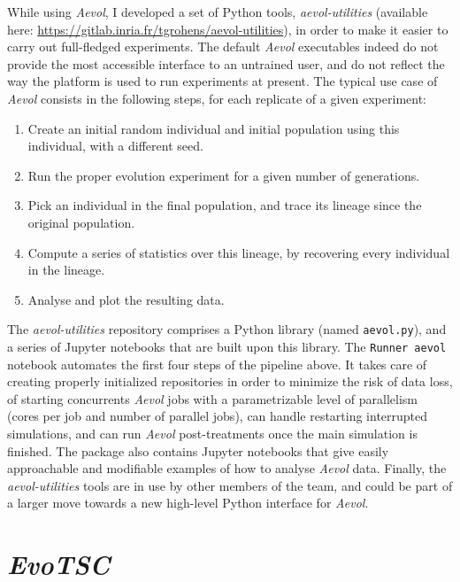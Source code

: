 While using \emph{Aevol}, I developed a set of Python tools, \emph{aevol-utilities} (available here: \url{https://gitlab.inria.fr/tgrohens/aevol-utilities}), in order to make it easier to carry out full-fledged experiments.
The default \emph{Aevol} executables indeed do not provide the most accessible interface to an untrained user, and do not reflect the way the platform is used to run experiments at present.
The typical use case of \emph{Aevol} consists in the following steps, for each replicate of a given experiment:
\begin{enumerate}
  \item Create an initial random individual and initial population using this individual, with a different seed.
  \item Run the proper evolution experiment for a given number of generations.
  \item Pick an individual in the final population, and trace its lineage since the original population.
  \item Compute a series of statistics over this lineage, by recovering every individual in the lineage.
  \item Analyse and plot the resulting data.
\end{enumerate}

The \emph{aevol-utilities} repository comprises a Python library (named \texttt{aevol.py}), and a series of Jupyter notebooks that are built upon this library.
The \texttt{Runner aevol} notebook automates the first four steps of the pipeline above.
It takes care of creating properly initialized repositories in order to minimize the risk of data loss, of starting concurrents \emph{Aevol} jobs with a parametrizable level of parallelism (cores per job and number of parallel jobs), can handle restarting interrupted simulations, and can run \emph{Aevol} post-treatments once the main simulation is finished.
The package also contains Jupyter notebooks that give easily approachable and modifiable examples of how to analyse \emph{Aevol} data.
Finally, the \emph{aevol-utilities} tools are in use by other members of the team, and could be part of a larger move towards a new high-level Python interface for \emph{Aevol}.



\section{\emph{EvoTSC}}

